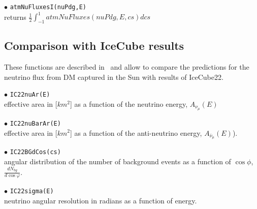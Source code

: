 \documentclass[12pt,a4paper]{article}
\begin{document}
\noindent $\bullet$ \verb|atmNuFluxesI(nuPdg,E)| \\    
returns  $ \frac{1}{2}\int_{-1}^{1} atmNuFluxes(nuPdg,E,cs)dcs$



\subsection{Comparison with IceCube results}


These functions are described in~\cite{Belanger:2015hra} and allow to compare the predictions for the neutrino flux from DM captured in the Sun with results of IceCube22.

\noindent
$\bullet$ \verb|IC22nuAr(E)|\\
effective area in [$km^2$] as a function of the neutrino energy, $A_{\nu_{\mu}}(E)$ 

\noindent$\bullet$ \verb|IC22nuBarAr(E)|\\
effective area in [$km^2$] as a function of the anti-neutrino energy, $A_{\bar{\nu}_{\mu}}(E)$).


\noindent
$\bullet$ \verb|IC22BGdCos(cs)| \\
angular distribution of the number of background events as a function of $\cos\phi$, $\frac{dN_{bg}}{d\cos{\varphi}}$.
  
 \noindent 
$\bullet$ \verb|IC22sigma(E)|\\
neutrino angular resolution in radians  as a function of energy. 
\end{document}
